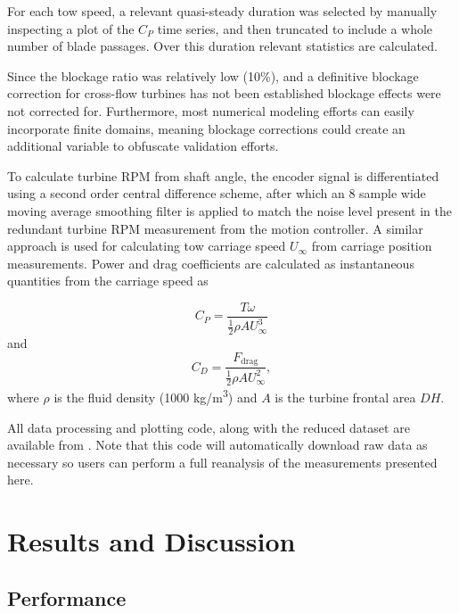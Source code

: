 \documentclass[10pt,letterpaper]{article}
\begin{document}
For each tow speed, a relevant quasi-steady duration was selected by manually
inspecting a plot of the $C_P$ time series, and then truncated to include a
whole number of blade passages. Over this duration relevant statistics are
calculated. 

Since the blockage ratio was relatively low (10\%), and a definitive blockage
correction for cross-flow turbines has not been established \cite{Cavagnaro2014}
blockage effects were not corrected for. Furthermore, most numerical modeling
efforts can easily incorporate finite domains, meaning blockage corrections
could create an additional variable to obfuscate validation efforts.

To calculate turbine RPM from shaft angle, the encoder signal is differentiated
using a second order central difference scheme, after which an 8 sample wide
moving average smoothing filter is applied to match the noise level present in
the redundant turbine RPM measurement from the motion controller. A similar
approach is used for calculating tow carriage speed $U_\infty$ from carriage
position measurements. Power and drag coefficients are calculated as
instantaneous quantities from the carriage speed as

\begin{equation}
    C_P = \frac{T \omega}{\frac{1}{2} \rho A U_\infty^3}
\end{equation}
and
\begin{equation}
    C_D = \frac{F_\mathrm{drag}}{\frac{1}{2} \rho A U_\infty^2},
\end{equation}
where $\rho$ is the fluid density (1000 kg/m\textsuperscript{3}) and $A$ is
the turbine frontal area $DH$.

All data processing and plotting code, along with the reduced dataset are
available from \cite{Bachant2015-RM2-data}. Note that this code will
automatically download raw data as necessary so users can perform a full
reanalysis of the measurements presented here.


\section*{Results and Discussion}

\subsection*{Performance}
\end{document}
